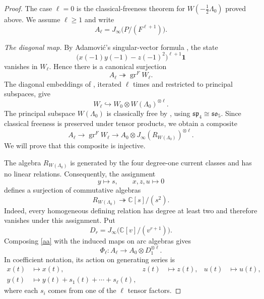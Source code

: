 \documentclass[11pt]{amsart}
\theoremstyle{definition}
\theoremstyle{remark}
\begin{document}
\begin{proof}
The case $\ell=0$ is the classical-freeness theorem for
$W(-\tfrac12\Lambda_0)$ proved above. We assume $\ell\ge1$ and write
\[
 A_\ell=J_\infty\bigl(P/(F^{\ell+1})\bigr).
\]

\medskip
\noindent\emph{The diagonal map.}
By Adamovi\'c's singular-vector formula
\cite[Theorem~3.1]{Adamovic}, the state
\[
 \bigl(x(-1)y(-1)-z(-1)^2\bigr)^{\ell+1}\mathbf1
\]
vanishes in $W_\ell$. Hence there is a canonical surjection
\[
 A_\ell\twoheadrightarrow\operatorname{gr}^{F}W_\ell.
\]
The diagonal embeddings of
\cite[Theorem~3.4]{Adamovic}, iterated $\ell$ times and
restricted to principal subspaces, give
\[
 W_\ell\hookrightarrow
 W_0\otimes W(\Lambda_0)^{\otimes\ell}.
\]
The principal subspace $W(\Lambda_0)$ is classically free by
\cite[Corollary~6.4]{LiMilas}, using
$\mathfrak{sp}_4\cong\mathfrak{so}_5$.
Since classical freeness is preserved under tensor products,
we obtain a composite
\begin{equation} \label{aa}
 A_\ell
 \longrightarrow \operatorname{gr}^{F}W_\ell
 \longrightarrow
 A_0\otimes
 J_\infty(R_{W(\Lambda_0)})^{\otimes\ell}.
\end{equation}
We will prove that this composite is injective.

The algebra $R_{W(\Lambda_0)}$ is generated by the four
degree-one current classes and has no linear relations.
Consequently, the assignment
\[
 y\longmapsto s,\qquad x,z,u\longmapsto0
\]
defines a surjection of commutative algebras
\[
 R_{W(\Lambda_0)}
 \twoheadrightarrow\mathbb C[s]/(s^2).
\]
Indeed, every homogeneous defining relation has degree at
least two and therefore vanishes under this assignment.
Put
\[
 D_r=J_\infty\bigl(\mathbb C[v]/(v^{r+1})\bigr).
\]
Composing \eqref{aa} with the induced maps on arc algebras gives
\[
 \Phi_\ell:A_\ell\longrightarrow A_0\otimes D_1^{\otimes\ell}.
\]
In coefficient notation, its action on generating series is
\[
 \begin{aligned}
 x(t)&\longmapsto x(t),&
 z(t)&\longmapsto z(t),&
 u(t)&\longmapsto u(t),\\
 y(t)&\longmapsto y(t)+s_1(t)+\cdots+s_\ell(t),
 \end{aligned}
\]
where each $s_i$ comes from one of the $\ell$ tensor factors.


\end{proof}
\end{document}
